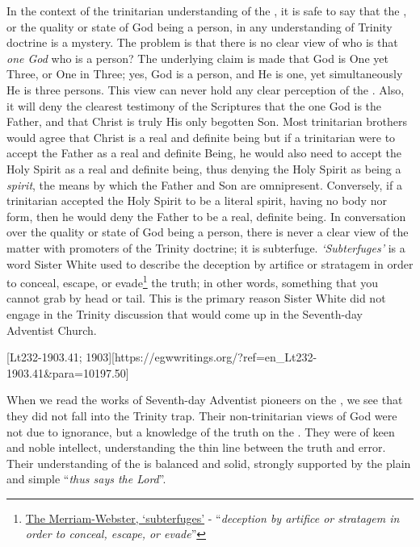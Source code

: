 In the context of the trinitarian understanding of the , it is safe to say that the , or the quality or state of God being a person, in any understanding of Trinity doctrine is a mystery. The problem is that there is no clear view of who is that \textit{one God} who is a person? The underlying claim is made that God is One yet Three, or One in Three; yes, God is a person, and He is one, yet simultaneously He is three persons. This view can never hold any clear perception of the . Also, it will deny the clearest testimony of the Scriptures that the one God is the Father, and that Christ is truly His only begotten Son. Most trinitarian brothers would agree that Christ is a real and definite being but if a trinitarian were to accept the Father as a real and definite Being, he would also need to accept the Holy Spirit as a real and definite being, thus denying the Holy Spirit as being a \textit{spirit}, the means by which the Father and Son are omnipresent. Conversely, if a trinitarian accepted the Holy Spirit to be a literal spirit, having no body nor form, then he would deny the Father to be a real, definite being. In conversation over the quality or state of God being a person, there is never a clear view of the matter with promoters of the Trinity doctrine; it is subterfuge. \textit{‘Subterfuges’} is a word Sister White used to describe the deception by artifice or stratagem in order to conceal, escape, or evade\footnote{\href{https://www.merriam-webster.com/dictionary/subterfuges}{The Merriam-Webster, ‘subterfuges’} - “\textit{deception by artifice or stratagem in order to conceal, escape, or evade}”} the truth; in other words, something that you cannot grab by head or tail. This is the primary reason Sister White did not engage in the Trinity discussion that would come up in the Seventh-day Adventist Church.

[Lt232-1903.41; 1903][https://egwwritings.org/?ref=en\_Lt232-1903.41&para=10197.50]

When we read the works of Seventh-day Adventist pioneers on the , we see that they did not fall into the Trinity trap. Their non-trinitarian views of God were not due to ignorance, but a knowledge of the truth on the . They were of keen and noble intellect, understanding the thin line between the truth and error. Their understanding of the  is balanced and solid, strongly supported by the plain and simple “\textit{thus says the Lord}”.

